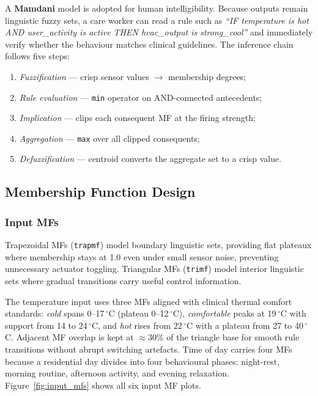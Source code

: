 \documentclass[10pt,twocolumn,a4paper]{article}
\begin{document}
A \textbf{Mamdani} model is adopted for human intelligibility. Because outputs remain linguistic fuzzy sets, a care worker can read a rule such as \textit{``IF temperature is hot AND user\_activity is active THEN hvac\_output is strong\_cool''} and immediately verify whether the behaviour matches clinical guidelines. The inference chain follows five steps:
\begin{enumerate}[leftmargin=*, noitemsep, topsep=2pt]
  \item \textit{Fuzzification} --- crisp sensor values $\to$ membership degrees;
  \item \textit{Rule evaluation} --- \texttt{min} operator on AND-connected antecedents;
  \item \textit{Implication} --- clips each consequent MF at the firing strength;
  \item \textit{Aggregation} --- \texttt{max} over all clipped consequents;
  \item \textit{Defuzzification} --- centroid converts the aggregate set to a crisp value.
\end{enumerate}

\subsection{Membership Function Design}

\subsubsection{Input MFs}

Trapezoidal MFs (\texttt{trapmf}) model boundary linguistic sets, providing flat plateaux where membership stays at 1.0 even under small sensor noise, preventing unnecessary actuator toggling. Triangular MFs (\texttt{trimf}) model interior linguistic sets where gradual transitions carry useful control information.

The temperature input uses three MFs aligned with clinical thermal comfort standards: \textit{cold} spans 0--17\,$^\circ$C (plateau 0--12\,$^\circ$C), \textit{comfortable} peaks at 19\,$^\circ$C with support from 14 to 24\,$^\circ$C, and \textit{hot} rises from 22\,$^\circ$C with a plateau from 27 to 40\,$^\circ$C. Adjacent MF overlap is kept at $\approx$30\% of the triangle base for smooth rule transitions without abrupt switching artefacts. Time of day carries four MFs because a residential day divides into four behavioural phases: night-rest, morning routine, afternoon activity, and evening relaxation. Figure~\ref{fig:input_mfs} shows all six input MF plots.
\end{document}
